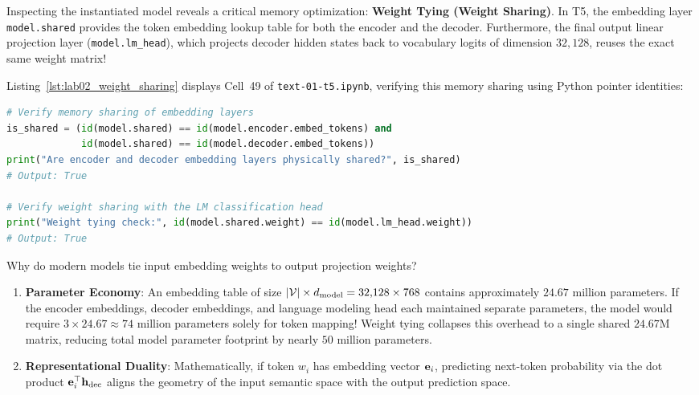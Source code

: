 \documentclass[../labs.tex]{subfiles}
\begin{document}
Inspecting the instantiated model reveals a critical memory optimization: \textbf{Weight Tying (Weight Sharing)}. In T5, the embedding layer \texttt{model.shared} provides the token embedding lookup table for both the encoder and the decoder. Furthermore, the final output linear projection layer (\texttt{model.lm\_head}), which projects decoder hidden states back to vocabulary logits of dimension $32{,}128$, reuses the exact same weight matrix!

Listing~\ref{lst:lab02_weight_sharing} displays Cell~49 of \texttt{text-01-t5.ipynb}, verifying this memory sharing using Python pointer identities:

\begin{lstlisting}[language=Python, caption={Verifying weight sharing across encoder, decoder, and LM head (Cells 47--49).}, label={lst:lab02_weight_sharing}]
# Verify memory sharing of embedding layers
is_shared = (id(model.shared) == id(model.encoder.embed_tokens) and 
             id(model.shared) == id(model.decoder.embed_tokens))
print("Are encoder and decoder embedding layers physically shared?", is_shared)
# Output: True

# Verify weight sharing with the LM classification head
print("Weight tying check:", id(model.shared.weight) == id(model.lm_head.weight))
# Output: True
\end{lstlisting}

\begin{examinsight}
Why do modern models tie input embedding weights to output projection weights?
\begin{enumerate}
    \item \textbf{Parameter Economy}: An embedding table of size $|\mathcal{V}| \times d_{\text{model}} = 32{,}128 \times 768$ contains approximately $24.67$ million parameters. If the encoder embeddings, decoder embeddings, and language modeling head each maintained separate parameters, the model would require $3 \times 24.67 \approx 74$ million parameters solely for token mapping! Weight tying collapses this overhead to a single shared $24.67$M matrix, reducing total model parameter footprint by nearly $50$ million parameters.
    \item \textbf{Representational Duality}: Mathematically, if token $w_i$ has embedding vector $\mathbf{e}_i$, predicting next-token probability via the dot product $\mathbf{e}_i^\top \mathbf{h}_{\text{dec}}$ aligns the geometry of the input semantic space with the output prediction space.
\end{enumerate}
\end{examinsight}
\end{document}
